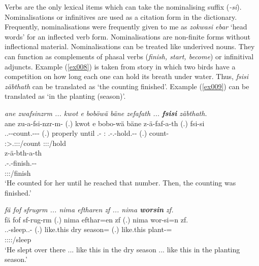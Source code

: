 Verbs are the only lexical items which can take the nominalising suffix (\emph{-si}). Nominalisations or infinitives are used as a citation form in the dictionary. Frequently, nominalisations were frequently given to me as \emph{zokwasi ebar} `head words' for an inflected verb form. Nominalisations are non-finite forms without inflectional material. Nominalisations can be treated like underived nouns. They can function as complements of phasal verbs (\textit{finish, start, become}) or infinitival adjuncts. Example (\ref{ex008}) is taken from story in which two birds have a competition on how long each one can hold its breath under water. Thus, \emph{fsisi zäbthath} can be translated as `the counting finished'. Example (\ref{ex009}) can be translated as `in the planting (season)'.

\begin{exe}
	\ex \textit{ane zwafsinzrm ... kwot e boböwä bäne zefafath ... \textbf{fsisi} \linebreak zäbthath.}\\
	\glll ane zu-a-fsi-nzr-m-\Zero{} (.) kwot e bobo-wä bäne z-ä-faf-a-th (.) fsi-si\\
	\Dem{} \Tsg.\F.\Betatwo-\Vc-count.\Ext-\Ndu-\Dur-\Stsg{} (.) properly until \Med{}.\All{}-\Emph{} \Dem{}:\Med{} \M.\Gam-\Vc.\Ndu-hold.\Rs-\Pst-\Stnsg{} (.) count-\Nmlz{}\\
	{} \footnotesize{\Stsg:\Sbj>\Tsg.\F:\Io:\Pst:\Dur/count} {} {} {} {} {} \footnotesize{\Stpl:\Sbj:\Pst:\Pfv/hold} {} {}\\
	\sn
	\glll z-ä-bth-a-th\\
	\M.\Gam-\Vc.\Ndu-finish.\Rs-\Pst-\Stnsg{}\\
	\footnotesize{\Stpl:\Sbj:\Pst:\Pfv/finish}\\
	\trans `He counted for her until he reached that number. Then, the counting was finished.'
	\label{ex008}
\end{exe}
\begin{exe}
	\ex \textit{fä fof sfrugrm ... nima eftharen zf ... nima \textbf{worsin} zf.}\\
	\glll fä fof sf-rug-rm (.) nima efthar=en zf (.) nima wor-si=n zf.\\
	\Dist{} \Emph{} \Tsg.\M.\Betatwo-sleep.\Ext.\Ndu-\Dur{} (.) {like.this} {dry season=\Loc} \Imm{} (.) {like.this} plant-\Nmlz=\Loc{} \Imm\\
	{} {} \footnotesize{\Tsg:\M:\Sbj:\Pst:\Dur/sleep} {} {} {} {} {} {} {} {}\\
	\trans `He slept over there ... like this in the dry season ... like this in the planting season.'
	\label{ex009}
\end{exe}

